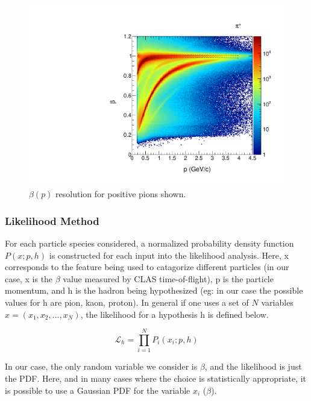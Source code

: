 \begin{figure}
  \label{fig:pbeta}
  \begin{center}
    \includegraphics[width=\columnwidth]{image/beautiful_pbeta_pip.pdf}
    \caption{$\beta(p)$ resolution for positive pions shown.}
  \end{center}
\end{figure}

\subsubsection{Likelihood Method}

For each particle species considered, a normalized probability density function $P(x;p,h)$ is constructed for each input into the likelihood analysis.  Here, x corresponds to the feature being used to catagorize different particles (in our case, x is the $\beta$ value measured by CLAS time-of-flight), p is the particle momentum, and h is the hadron being hypothesized (eg: in our case the possible values for h are pion, kaon, proton).  In general if one uses a set of $N$ variables $x = (x_1, x_2, ..., x_N)$, the likelihood for a hypothesis h is defined below.

\begin{equation}
  \mathcal{L}_h = \prod^{N}_{i=1} P_{i} (x_i; p, h)
\end{equation}

In our case, the only random variable we consider is $\beta$, and the likelihood is just the PDF.  Here, and in many cases where the choice is statistically appropriate, it is possible to use a Gaussian PDF for the variable $x_i$ ($\beta$).

